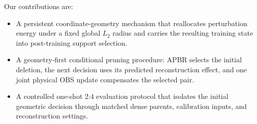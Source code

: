 \begin{samepage}
Our contributions are:
\begin{itemize}
\item A persistent coordinate-geometry mechanism that reallocates perturbation energy under a fixed global $L_2$ radius and carries the resulting training state into post-training support selection.
\item A geometry-first conditional pruning procedure: APBR selects the initial deletion, the next decision uses its predicted reconstruction effect, and one joint physical OBS update compensates the selected pair.
\item A controlled one-shot 2:4 evaluation protocol that isolates the initial geometric decision through matched dense parents, calibration inputs, and reconstruction settings.
\end{itemize}
\end{samepage}
